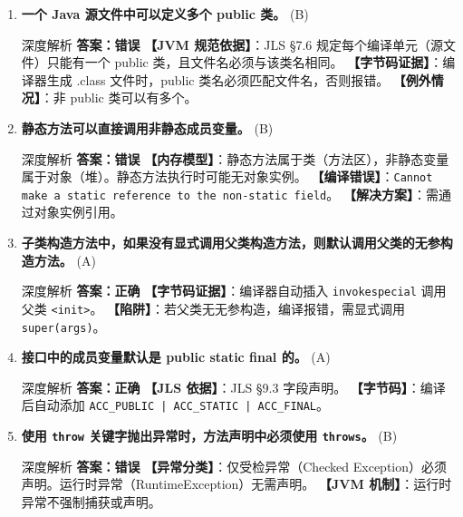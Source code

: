 ﻿\documentclass[12pt, a4paper]{ctexart}
\newcommand{\code}[1]{\texttt{#1}}
\newcommand{\tfblank}{\underline{\hspace{1.5em}}}
\begin{document}
\begin{enumerate}[label=\textbf{\arabic*.}, itemsep=1em]
	\item \textbf{一个 Java 源文件中可以定义多个 public 类。} \tfblank (B)
	      \begin{bluebox}{深度解析}
		      \textbf{答案：错误}
		      \textbf{【JVM 规范依据】}：JLS §7.6 规定每个编译单元（源文件）只能有一个 public 类，且文件名必须与该类名相同。
		      \textbf{【字节码证据】}：编译器生成 .class 文件时，public 类名必须匹配文件名，否则报错。
		      \textbf{【例外情况】}：非 public 类可以有多个。
	      \end{bluebox}

	\item \textbf{静态方法可以直接调用非静态成员变量。} \tfblank (B)
	      \begin{bluebox}{深度解析}
		      \textbf{答案：错误}
		      \textbf{【内存模型】}：静态方法属于类（方法区），非静态变量属于对象（堆）。静态方法执行时可能无对象实例。
		      \textbf{【编译错误】}：\code{Cannot make a static reference to the non-static field}。
		      \textbf{【解决方案】}：需通过对象实例引用。
	      \end{bluebox}

	\item \textbf{子类构造方法中，如果没有显式调用父类构造方法，则默认调用父类的无参构造方法。} \tfblank (A)
	      \begin{bluebox}{深度解析}
		      \textbf{答案：正确}
		      \textbf{【字节码证据】}：编译器自动插入 \code{invokespecial} 调用父类 \code{<init>}。
		      \textbf{【陷阱】}：若父类无无参构造，编译报错，需显式调用 \code{super(args)}。
	      \end{bluebox}

	\item \textbf{接口中的成员变量默认是 public static final 的。} \tfblank (A)
	      \begin{bluebox}{深度解析}
		      \textbf{答案：正确}
		      \textbf{【JLS 依据】}：JLS §9.3 字段声明。
		      \textbf{【字节码】}：编译后自动添加 \code{ACC\_PUBLIC | ACC\_STATIC | ACC\_FINAL}。
	      \end{bluebox}

	\item \textbf{使用 \code{throw} 关键字抛出异常时，方法声明中必须使用 \code{throws}。} \tfblank (B)
	      \begin{bluebox}{深度解析}
		      \textbf{答案：错误}
		      \textbf{【异常分类】}：仅受检异常（Checked Exception）必须声明。运行时异常（RuntimeException）无需声明。
		      \textbf{【JVM 机制】}：运行时异常不强制捕获或声明。
	      \end{bluebox}


\end{enumerate}
\end{document}
